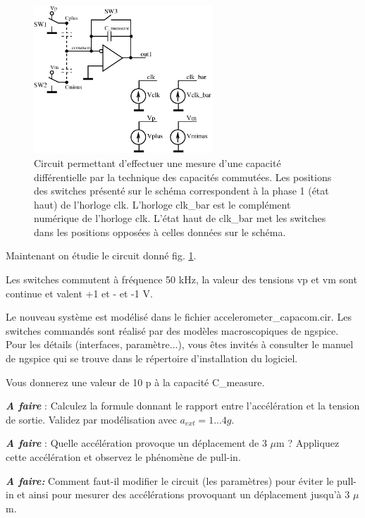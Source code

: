 \documentclass[12pt,A4,onecolumn,french]{article}
\begin{document}
\begin{figure}
 \centering
 \includegraphics[width=0.6\textwidth]{measurement_capacom.eps}
 \caption{Circuit permettant d'effectuer une mesure d'une capacité différentielle par la technique des capacités commutées. Les positions des switches présenté sur le schéma correspondent à la phase 1 (état haut) de l'horloge clk. L'horloge clk\_bar est le complément numérique de l'horloge clk. L'état haut de clk\_bar met les switches dans les positions opposées à celles données sur le schéma. \label{fig:capacom}}
\end{figure}

Maintenant on étudie le circuit donné fig. \ref{fig:capacom}. 

Les switches commutent à fréquence 50 kHz, la valeur des tensions vp et
vm sont continue et valent +1 et - et -1 V. 

Le nouveau système est modélisé dans le fichier accelerometer\_capacom.cir. Les switches commandés sont réalisé par des modèles macroscopiques de ngspice. Pour les détails (interfaces, paramètre...), vous êtes invités à consulter le manuel de ngspice qui se trouve dans le répertoire d'installation du logiciel. 

Vous donnerez une valeur de 10 p à la capacité C\_measure. 

\emph{\bf A faire} : Calculez la formule donnant le rapport entre l'accélération et la tension de sortie.  Validez par modélisation avec $a_{ext}=1...4 g$. 

\emph{\bf A faire} : Quelle accélération provoque un déplacement de 3 $\mu$m ? Appliquez cette accélération et observez le phénomène de pull-in.  

\emph{\bf A faire:} Comment faut-il modifier le circuit (les paramètres) pour éviter le pull-in et ainsi pour mesurer des accélérations provoquant un déplacement jusqu'à 3 $\mu$m. 
\end{document}
